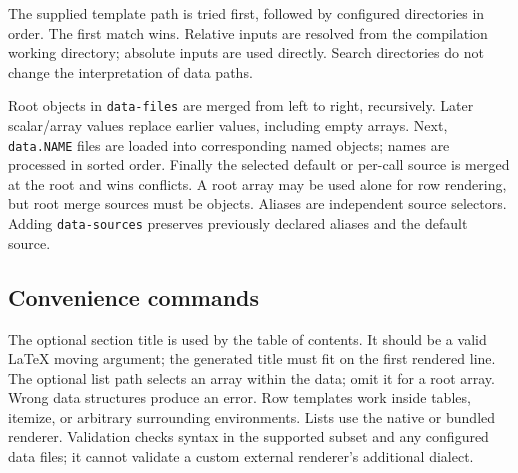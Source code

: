 \begin{preamblecode}
\end{preamblecode}

The supplied template path is tried first, followed by configured directories in
order. The first match wins. Relative inputs are resolved from the compilation
working directory; absolute inputs are used directly. Search directories do not
change the interpretation of data paths.

Root objects in \texttt{data-files} are merged from left to right, recursively.
Later scalar/array values replace earlier values, including empty arrays.
Next, \texttt{data.NAME} files are loaded into corresponding named objects; names
are processed in sorted order. Finally the selected default or per-call source
is merged at the root and wins conflicts. A root array may be used alone for row
rendering, but root merge sources must be objects. Aliases are independent source
selectors. Adding \texttt{data-sources} preserves previously declared aliases and
the default source.

\subsection{Convenience commands}

\begin{bodycode}
\begin{itemize}
\end{itemize}
\end{bodycode}

The optional section title is used by the table of contents. It should be a valid
LaTeX moving argument; the generated title must fit on the first rendered line.
The optional list path selects an array within the data; omit it for a root
array. Wrong data structures produce an error. Row templates work inside tables,
itemize, or arbitrary surrounding environments. Lists use the native or bundled
renderer. Validation checks syntax in the supported subset and any configured
data files; it cannot validate a custom external renderer's additional dialect.

